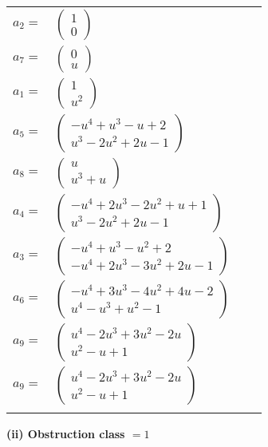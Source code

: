 \documentclass[1p]{elsarticle_modified}
\theoremstyle{definition}
\begin{document}
\begin{tabular}{m{7pt} m{180pt} m{7pt} m{180pt} }
\flushright $a_{2}=$&$\begin{pmatrix}1\\0\end{pmatrix}$ \\
\flushright $a_{7}=$&$\begin{pmatrix}0\\u\end{pmatrix}$ \\
\flushright $a_{1}=$&$\begin{pmatrix}1\\u^2\end{pmatrix}$ \\
\flushright $a_{5}=$&$\begin{pmatrix}- u^4+u^3- u+2\\u^3-2 u^2+2 u-1\end{pmatrix}$ \\
\flushright $a_{8}=$&$\begin{pmatrix}u\\u^3+u\end{pmatrix}$ \\
\flushright $a_{4}=$&$\begin{pmatrix}- u^4+2 u^3-2 u^2+u+1\\u^3-2 u^2+2 u-1\end{pmatrix}$ \\
\flushright $a_{3}=$&$\begin{pmatrix}- u^4+u^3- u^2+2\\- u^4+2 u^3-3 u^2+2 u-1\end{pmatrix}$ \\
\flushright $a_{6}=$&$\begin{pmatrix}- u^4+3 u^3-4 u^2+4 u-2\\u^4- u^3+u^2-1\end{pmatrix}$ \\
\flushright $a_{9}=$&$\begin{pmatrix}u^4-2 u^3+3 u^2-2 u\\u^2- u+1\end{pmatrix}$\\ \flushright $a_{9}=$&$\begin{pmatrix}u^4-2 u^3+3 u^2-2 u\\u^2- u+1\end{pmatrix}$\\&\end{tabular}
\flushleft \textbf{(ii) Obstruction class $= 1$}\\~\\
\end{document}
